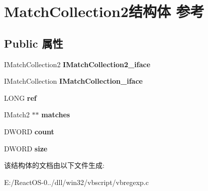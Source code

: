 \hypertarget{struct_match_collection2}{}\section{Match\+Collection2结构体 参考}
\label{struct_match_collection2}
\subsection*{Public 属性}
\begin{DoxyCompactItemize}
\item 
\mbox{\label{struct_match_collection2_a638de8e0e94b49507aaab781beb3986e}} 
I\+Match\+Collection2 {\bfseries I\+Match\+Collection2\+\_\+iface}
\item 
\mbox{\label{struct_match_collection2_a75d3b07a7ad8397b1a637ebc9ec5d8f0}} 
I\+Match\+Collection {\bfseries I\+Match\+Collection\+\_\+iface}
\item 
\mbox{\label{struct_match_collection2_a9fd08ea00f53f2ad3201f0adfce704f6}} 
L\+O\+NG {\bfseries ref}
\item 
\mbox{\label{struct_match_collection2_a7630de7ff64ba70d9eaf3f44afa6a96f}} 
I\+Match2 $\ast$$\ast$ {\bfseries matches}
\item 
\mbox{\label{struct_match_collection2_a142e11249eefb3428814aff6736810db}} 
D\+W\+O\+RD {\bfseries count}
\item 
\mbox{\label{struct_match_collection2_a229c9dfabfa66ee47fca899cad7e0b9e}} 
D\+W\+O\+RD {\bfseries size}
\end{DoxyCompactItemize}


该结构体的文档由以下文件生成\+:\begin{DoxyCompactItemize}
\item 
E\+:/\+React\+O\+S-\/0../dll/win32/vbscript/vbregexp.\+c\end{DoxyCompactItemize}
